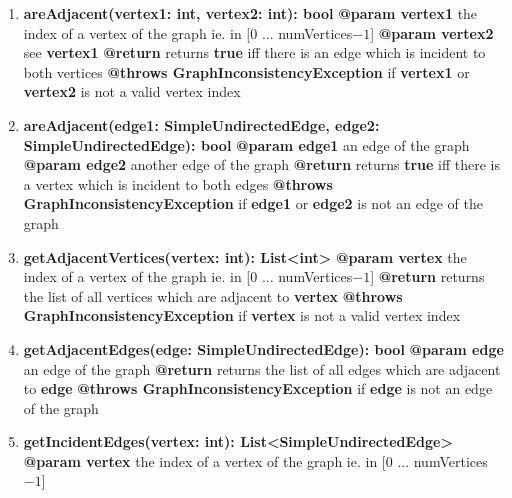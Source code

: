 \documentclass{article}
\begin{document}
\begin{enumerate}[+]
{		}
		\item{
			\textbf{areAdjacent(vertex1: int, vertex2: int): bool} \newline
			\textbf{@param vertex1} the index of a vertex of the graph ie. in [0 ... numVertices$-1$] \newline
			\textbf{@param vertex2} see \textbf{vertex1} \newline
			\textbf{@return} returns \textbf{true} iff there is an edge which is incident to both vertices \newline
			\textbf{@throws GraphInconsistencyException} if \textbf{vertex1} or \textbf{vertex2} is not a valid vertex index
		}
		\item{
			\textbf{areAdjacent(edge1: SimpleUndirectedEdge, edge2: SimpleUndirectedEdge): bool} \newline
			\textbf{@param edge1} an edge of the graph \newline
			\textbf{@param edge2} another edge of the graph \newline
			\textbf{@return} returns \textbf{true} iff there is a vertex which is incident to both edges \newline
			\textbf{@throws GraphInconsistencyException} if \textbf{edge1} or \textbf{edge2} is not an edge of the graph
		}
		\item{
			\textbf{getAdjacentVertices(vertex: int): List<int>} \newline
			\textbf{@param vertex} the index of a vertex of the graph ie. in [0 ... numVertices$-1$] \newline
			\textbf{@return} returns the list of all vertices which are adjacent to \textbf{vertex} \newline
			\textbf{@throws GraphInconsistencyException} if \textbf{vertex} is not a valid vertex index
		}
		\item{
			\textbf{getAdjacentEdges(edge: SimpleUndirectedEdge): bool} \newline
			\textbf{@param edge} an edge of the graph \newline
			\textbf{@return} returns the list of all edges which are adjacent to \textbf{edge} \newline
			\textbf{@throws GraphInconsistencyException} if \textbf{edge} is not an edge of the graph
		}
		\item{
			\textbf{getIncidentEdges(vertex: int): List<SimpleUndirectedEdge>} \newline
			\textbf{@param vertex} the index of a vertex of the graph ie. in [0 ... numVertices$-1$] \newline
}
\end{enumerate}
\end{document}
